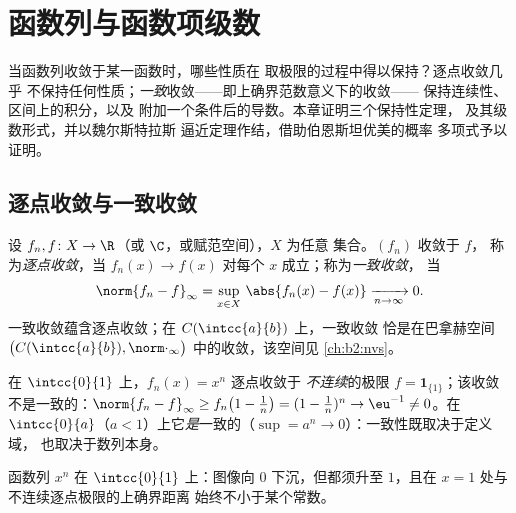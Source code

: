 \chapter{函数列与函数项级数}\label{ch:b2:funcseq}

当函数列收敛于某一函数时，哪些性质在
取极限的过程中得以保持？逐点收敛几乎
不保持任何性质；\emph{一致}收敛——即上确界范数意义下的收敛——
保持连续性、区间上的积分，以及
附加一个条件后的导数。本章证明三个保持性定理，
及其级数形式，并以魏尔斯特拉斯
逼近定理作结，借助伯恩斯坦优美的概率
多项式予以证明。

\section{逐点收敛与一致收敛}

\begin{definition}\label{def:b2:funcseq:def}
设 $f_n, f \colon X \to \R$（或 $\C$，或赋范空间），$X$ 为任意
集合。$(f_n)$ 收敛于 $f$，
称为\emph{逐点收敛}，当 $f_n(x) \to
f(x)$ 对每个 $x$ 成立；称为\emph{一致收敛}，
当
\[
\norm{f_n - f}_\infty = \sup_{x \in X}\, \abs{f_n(x) - f(x)}
\xrightarrow[n \to \infty]{} 0 .
\]
一致收敛蕴含逐点收敛；在 $C(\intcc{a}{b})$ 上，一致收敛
恰是在巴拿赫空间
$\bigl(C(\intcc{a}{b}), \norm\cdot_\infty\bigr)$ 中的收敛，该空间见
\cref{ch:b2:nvs}。
\end{definition}

\begin{example}\label{ex:b2:funcseq:xn}
在 $\intcc{0}{1}$ 上，$f_n(x) = x^n$ 逐点收敛于
\emph{不连续}的极限 $f = \mathbf{1}_{\{1\}}$；该收敛
不是一致的：$\norm{f_n - f}_\infty \geq f_n\bigl(1 -
\tfrac1n\bigr) = (1 - \tfrac1n)^n \to \eu^{-1} \neq 0$。在
$\intcc{0}{a}$（$a < 1$）上它\emph{是}一致的（$\sup = a^n \to
0$）：一致性既取决于定义域，
也取决于数列本身。
\end{example}

\begin{omfigure}

{\small 函数列 $x^n$ 在 $\intcc{0}{1}$ 上：图像向
$0$ 下沉，但都须升至 $1$，且在 $x = 1$ 处与不连续逐点极限的上确界距离
始终不小于某个常数。}
\end{omfigure}

